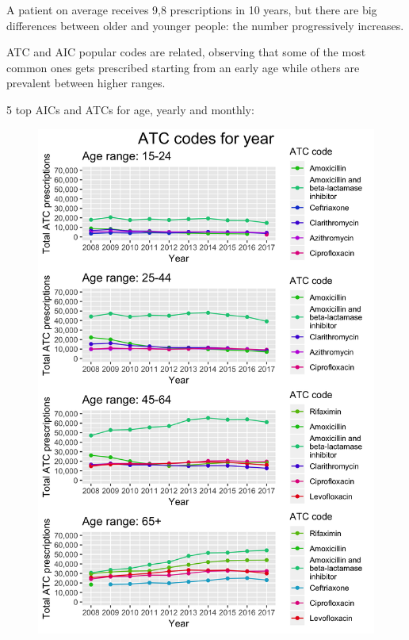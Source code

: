 A patient on average receives 9,8 prescriptions in 10 years, but there are big differences between older and younger people: the number progressively increases.

ATC and AIC popular codes are related, observing that some of the most common ones gets prescribed starting from an early age while others are prevalent between higher ranges.

5 top AICs and ATCs for age, yearly and monthly: %

\begin{figure}[h]
	\centering
	\includegraphics[scale=0.29]{../plots/top_atc_age-year.png}
\end{figure}

